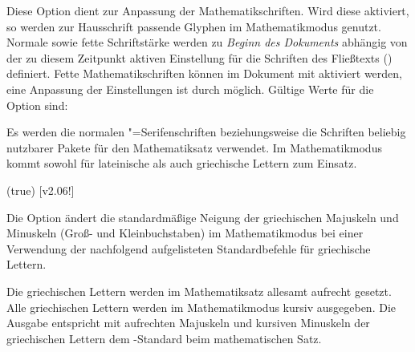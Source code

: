 \begin{DeclareEntity*}{}
\begin{DeclareEntity*}{}
\begin{DeclareEntity*}{}
\begin{Declaration}
Diese Option dient zur Anpassung der Mathematikschriften. Wird diese aktiviert, 
so werden zur Hausschrift passende Glyphen im Mathematikmodus genutzt. Normale 
sowie fette Schriftstärke werden zu \emph{Beginn des Dokuments} abhängig von 
der zu diesem Zeitpunkt aktiven Einstellung für die Schriften des Fließtexts 
() definiert. Fette Mathematikschriften 
können im Dokument mit  aktiviert werden, eine Anpassung der 
Einstellungen ist durch  möglich. Gültige Werte für die 
Option  sind:
%
\begin{DeclareValues}{}
  Es werden die normalen "=Serifenschriften beziehungsweise 
  die Schriften beliebig nutzbarer Pakete für den Mathematiksatz verwendet.
  Im Mathematikmodus kommt \OpenSans sowohl für lateinische als auch 
  griechische Lettern zum Einsatz.
\end{DeclareValues}
\end{Declaration}

\begin{Declaration}
  {}
  (true)
  [v2.06!]

Die Option ändert die standardmäßige Neigung der griechischen Majuskeln und 
Minuskeln (Groß- und Kleinbuchstaben) im Mathematikmodus bei einer Verwendung 
der nachfolgend aufgelisteten Standardbefehle für griechische Lettern.
%
\begin{DeclareValues}{}
  Die griechischen Lettern werden im Mathematiksatz allesamt aufrecht gesetzt.
  Alle griechischen Lettern werden im Mathematikmodus kursiv ausgegeben.
  Die Ausgabe entspricht mit aufrechten Majuskeln und kursiven Minuskeln der 
  griechischen Lettern dem -Standard beim mathematischen Satz.
\end{DeclareValues}
\end{Declaration}


\end{DeclareEntity*}
\end{DeclareEntity*}
\end{DeclareEntity*}
